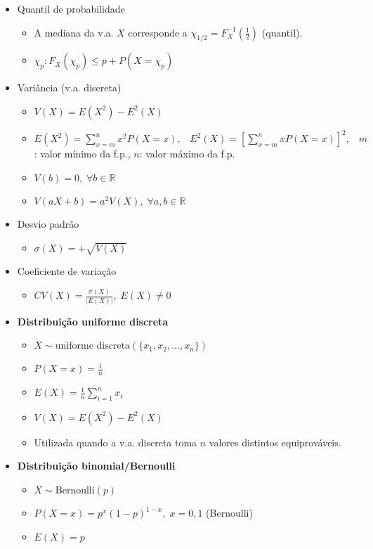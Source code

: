 \documentclass[a4paper]{report}
\newcommand{\bld}{\textbf}
\newcommand{\espaco}{\;\;\;}
\begin{document}
\begin{itemize}
		\item Quantil de probabilidade
		\begin{itemize}
			\item A mediana da v.a. $X$ corresponde a $\chi_{1/2}=F_X^{-1}\left(\frac 1 2\right)$ (quantil).
			\item $\chi_p:F_X(\chi_p)\leq p+P(X=\chi_p)$
		\end{itemize}
		\item Variância (v.a. discreta)
		\begin{itemize}
			\item $V(X)=E(X^2)-E^2(X)$
			\item $E(X^2)=\sum_{x=m}^n x^2P(X=x),\espaco E^2(X)=\left[\sum_{x=m}^n xP(X=x)\right]^2,\espaco m$: valor mínimo da f.p., $n$: valor máximo da f.p.
			\item $V(b)=0,\;\forall b \in \mathbb R$
			\item $V(aX+b)=a^2V(X),\;\forall a,b\in\mathbb R$
		\end{itemize}
		\item Desvio padrão
		\begin{itemize}
			\item $\sigma(X)=+\sqrt{V(X)}$
		\end{itemize}
		\item Coeficiente de variação
		\begin{itemize}
			\item $CV(X)=\frac{\sigma(X)}{|E(X)|},\;E(X)\neq 0$
		\end{itemize}
		\item {\large \bld{Distribuição uniforme discreta}}
		\begin{itemize}
			\item $X\sim\text{uniforme discreta}(\{x_1,x_2,\ldots,x_n\})$
			\item $P(X=x)=\frac 1 n$
			\item $E(X)=\frac 1 n \sum_{i=1}^n x_i$
			\item $V(X)=E(X^2)-E^2(X)$
			\item Utilizada quando a v.a. discreta toma $n$ valores distintos equiprováveis.
		\end{itemize}
		\item {\large \bld{Distribuição binomial/Bernoulli}}
		\begin{itemize}
			\item $X\sim \text{Bernoulli}(p)$
			\item $P(X=x)=p^x(1-p)^{1-x},\;x=0,1$ (Bernoulli)
			\item $E(X)=p$

\end{itemize}
\end{itemize}
\end{document}
